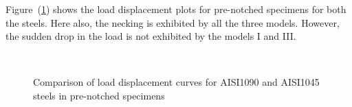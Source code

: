 Figure~(\ref{fig:chap8:load_disp_plot_prenecked_diff_coefficients}) shows the load displacement plots for pre-notched specimens for both the steels. Here also, the necking is exhibited by all the three models. However, the sudden drop in the load is not exhibited by the models I and III.
\begin{figure}[ht]
\centering
{} \\ %
{}
\caption{Comparison of load displacement curves for AISI1090 and AISI1045 steels in pre-notched specimens}
\label{fig:chap8:load_disp_plot_prenecked_diff_coefficients}
\end{figure}


